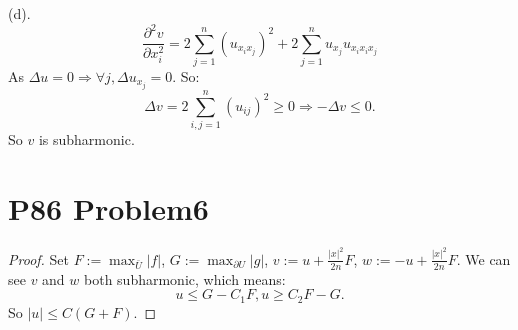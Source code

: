 \documentclass[a4paper]{ctexart}
\newcommand{\pdfFrac}[2]{\frac{\partial #1}{\partial #2}}
\begin{document}
(d).
\begin{equation}
    \pdfFrac{^{2}v}{x_{i}^{2}}=2\sum_{j=1}^{n}(u_{x_{i}x_{j}})^{2}+2\sum_{j=1}^{n}u_{x_{j}}u_{x_{i}x_{i}x_{j}}
\end{equation}
As $\Delta u=0\Rightarrow\forall j,\Delta u_{x_{j}}=0$. So:
\begin{equation}
    \Delta v=2\sum_{i,j=1}^{n}(u_{ij})^{2}\ge 0\Rightarrow -\Delta v\le0.
\end{equation}
So $v$ is subharmonic.
\section*{P86 Problem6}
\begin{proof}
Set $F:=\max_{\bar{U}}|f|$, $G:=\max_{\partial U}|g|$, $v:=u+\frac{|x|^{2}}{2n}F$, $w:=-u+\frac{|x|^{2}}{2n}F$. 
We can see $v$ and $w$ both subharmonic, which means:
$$
u\le G-C_{1}F,u\ge C_{2}F-G.
$$
So $|u|\le C(G+F)$.
\end{proof}
\end{document}
